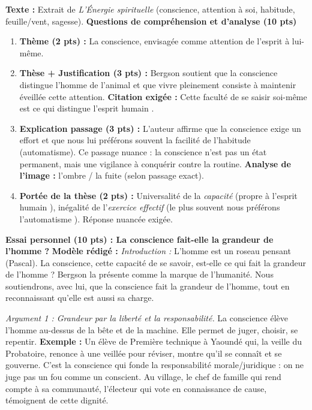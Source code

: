 \documentclass[11pt]{article}
\newcommand{\cle}[1]{{\popxbold\color{popdark}#1}}
\begin{document}
\begin{exoresolu}
\textbf{Texte :} Extrait de \emph{L'Énergie spirituelle} (conscience, attention à soi, habitude, feuille/vent, sagesse).
\tcblower
\textbf{Questions de compréhension et d'analyse (10 pts)}
\begin{enumerate}
\item \textbf{Thème (2 pts) :} La conscience, envisagée comme \cle{attention de l'esprit à lui-même}.
\item \textbf{Thèse + Justification (3 pts) :} Bergson soutient que la conscience distingue l'homme de l'animal et que vivre pleinement consiste à maintenir éveillée cette attention. \textbf{Citation exigée :} \og Cette faculté de se saisir soi-même est ce qui distingue l'esprit humain \fg.
\item \textbf{Explication passage (3 pts) :} L'auteur affirme que la conscience exige un effort et que nous lui préférons souvent la facilité de l'habitude (automatisme). Ce passage nuance : la conscience n'est pas un état permanent, mais une vigilance à conquérir contre la routine. \textbf{Analyse de l'image :} l'ombre / la fuite (selon passage exact).
\item \textbf{Portée de la thèse (2 pts) :} Universalité de la \emph{capacité} (propre à \og l'esprit humain \fg), inégalité de l'\emph{exercice effectif} (\og le plus souvent nous préférons l'automatisme \fg). Réponse nuancée exigée.
\end{enumerate}

\textbf{Essai personnel (10 pts) : \og La conscience fait-elle la grandeur de l'homme ? \fg}
\textbf{Modèle rédigé :}
\textit{Introduction :} \og L'homme est un roseau pensant \fg (Pascal). La conscience, cette capacité de se savoir, est-elle ce qui fait la grandeur de l'homme ? Bergson la présente comme la marque de l'humanité. Nous soutiendrons, avec lui, que la conscience fait la grandeur de l'homme, tout en reconnaissant qu'elle est aussi sa charge.

\textit{Argument 1 : Grandeur par la liberté et la responsabilité.} La conscience élève l'homme au-dessus de la bête et de la machine. Elle permet de juger, choisir, se repentir. \textbf{Exemple :} Un élève de Première technique à Yaoundé qui, la veille du Probatoire, renonce à une veillée pour réviser, montre qu'il se connaît et se gouverne. C'est la conscience qui fonde la responsabilité morale/juridique : on ne juge pas un fou comme un conscient. Au village, le chef de famille qui rend compte à sa communauté, l'électeur qui vote en connaissance de cause, témoignent de cette dignité.


\end{exoresolu}
\end{document}
